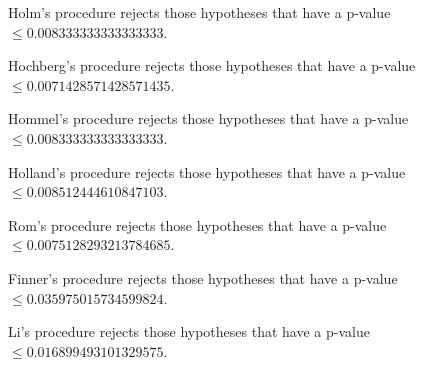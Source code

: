 \documentclass[a4paper,10pt]{article}
\begin{document}
\begin{landscape}
Holm's procedure rejects those hypotheses that have a p-value $\le0.008333333333333333$.


Hochberg's procedure rejects those hypotheses that have a p-value $\le0.0071428571428571435$.


Hommel's procedure rejects those hypotheses that have a p-value $\le0.008333333333333333$.


Holland's procedure rejects those hypotheses that have a p-value $\le0.008512444610847103$.


Rom's procedure rejects those hypotheses that have a p-value $\le0.0075128293213784685$.


Finner's procedure rejects those hypotheses that have a p-value $\le0.035975015734599824$.


Li's procedure rejects those hypotheses that have a p-value $\le0.016899493101329575$.



\newpage


\end{landscape}
\end{document}
